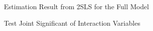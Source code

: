 Estimation Result from 2SLS for the Full Model
\begin{stlog}\end{stlog}
Test Joint Significant of Interaction Variables
\begin{stlog}\end{stlog}
